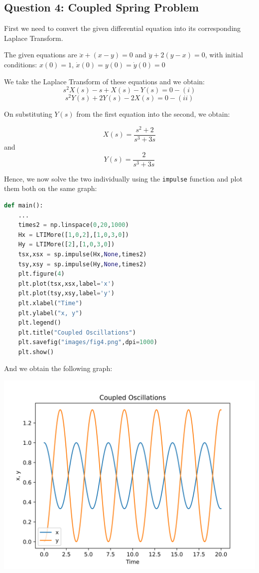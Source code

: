 \documentclass[12pt]{article}
\begin{document}
\subsection{Question 4: Coupled Spring Problem}

First we need to convert the given differential equation into its corresponding Laplace Transform.

The given equations are $\ddot x + (x-y) = 0$ and $\ddot y + 2(y-x) = 0$, with initial conditions: $x(0)=1$, $\dot x(0) = y(0) = \dot y(0) = 0$

We take the Laplace Transform of these equations and we obtain:
$$s^2 X(s) - s + X(s) - Y(s) = 0 - (i)$$
$$s^2Y(s)+2Y(s)-2X(s)=0 - (ii)$$

On substituting $Y(s)$ from the first equation into the second, we obtain:

$$X(s) = \frac{s^2+2}{s^3+3s}$$ 
and $$Y(s) = \frac{2}{s^3+3s}$$

Hence, we now solve the two individually using the \texttt{impulse} function and plot them both on the same graph:

\begin{lstlisting}[language=Python]
def main():
    ...
    times2 = np.linspace(0,20,1000)
    Hx = LTIMore([1,0,2],[1,0,3,0])
    Hy = LTIMore([2],[1,0,3,0])
    tsx,xsx = sp.impulse(Hx,None,times2)
    tsy,xsy = sp.impulse(Hy,None,times2)
    plt.figure(4)
    plt.plot(tsx,xsx,label='x')
    plt.plot(tsy,xsy,label='y')
    plt.xlabel("Time")
    plt.ylabel("x, y")
    plt.legend()
    plt.title("Coupled Oscillations")
    plt.savefig("images/fig4.png",dpi=1000)
    plt.show()
\end{lstlisting}

And we obtain the following graph:
\begin{center}
    \includegraphics[scale=1]{images/fig4.png}
\end{center}
\end{document}
